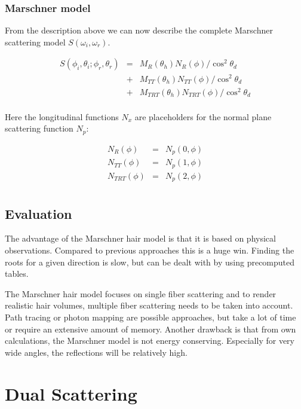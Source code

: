 \documentclass[11pt,a4paper]{report}
\begin{document}
\subsubsection{Marschner model}

From the description above we can now describe the complete Marschner scattering model $S(\omega_i, \omega_r)$.

\begin{eqnarray*}
S(\phi_i,\theta_i; \phi_r, \theta_r) & = & M_R(\theta_h) N_R(\phi) / \cos^2 \theta_d \\
& + & M_{TT}(\theta_h) N_{TT}(\phi) / \cos^2 \theta_d \\
& + & M_{TRT}(\theta_h) N_{TRT}(\phi) / \cos^2 \theta_d \\
\end{eqnarray*}

Here the longitudinal functions $N_x$ are placeholders for the normal plane scattering function $N_p$:

\begin{eqnarray*}
N_R(\phi) & = & N_p(0, \phi) \\
N_{TT}(\phi) & = & N_p(1, \phi) \\
N_{TRT}(\phi) & = & N_p(2, \phi) \\
\end{eqnarray*}
\subsection{Evaluation}

The advantage of the Marschner hair model is that it is based on physical observations. Compared to previous approaches this is a huge win. Finding the roots for a given direction is slow, but can be dealt with by using precomputed tables.

The Marschner hair model focuses on single fiber scattering and to render realistic hair volumes, multiple fiber scattering needs to be taken into account. Path tracing or photon mapping are possible approaches, but take a lot of time or require an extensive amount of memory. Another drawback is that from own calculations, the Marschner model is not energy conserving. Especially for very wide angles, the reflections will be relatively high.

%
%

\section{Dual Scattering}
\end{document}
